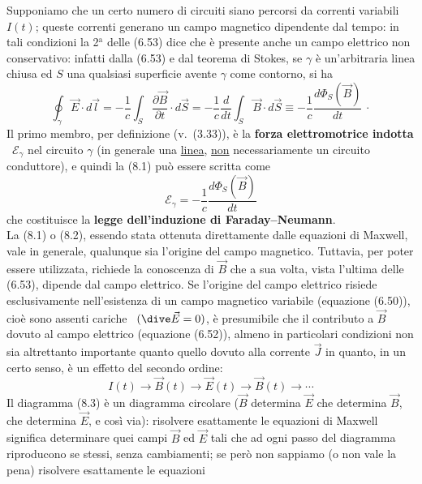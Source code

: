 Supponiamo che un certo numero di circuiti siano percorsi da correnti variabili
$I(t)$; queste correnti generano un campo magnetico dipendente dal tempo: in
tali condizioni la 2$^\mathrm{a}$ delle (6.53) dice che \`e presente anche un
campo elettrico non conservativo: infatti dalla (6.53) e dal teorema di Stokes,
se $\gamma$ \`e un'arbitraria linea chiusa ed $S$ una qualsiasi superficie
avente $\gamma$ come contorno, si ha
\begin{equation}
  \oint_\gamma\vec E\cdot d\vec l
  =-\frac{1}{c}\int_S\frac{\partial\vec B}{\partial t}\cdot d\vec S
  =-\frac{1}{c}\frac{d}{dt}\int_S\vec B\cdot d\vec S
  \equiv-\frac{1}{c}\frac{d\Phi_S(\vec B)}{dt}\,\cdot
  \tag{8.1}
\end{equation}
Il primo membro, per definizione \big(v.\ (3.33)\big), \`e la \textbf{forza
elettromotrice indotta} \ $\mathcal E_\gamma$ nel circuito $\gamma$ (in generale
una \underline{linea}, \underline{non} necessariamente un circuito conduttore),
e quindi la (8.1) pu\`o essere scritta come
\begin{equation}
  \mathcal E_\gamma=-\frac{1}{c}\frac{d\Phi_S(\vec B)}{dt}
  \tag{8.2}
\end{equation}
che costituisce la \textbf{legge dell'induzione di Faraday--Neumann}.\\
La (8.1) o (8.2), essendo stata ottenuta direttamente dalle equazioni di
Maxwell, vale in generale, qualunque sia l'origine del campo magnetico.
Tuttavia, per poter essere utilizzata, richiede la conoscenza di $\vec B$ che a
sua volta, vista l'ultima delle (6.53), dipende dal campo elettrico. Se
l'origine del campo elettrico risiede esclusivamente nell'esistenza di un campo
magnetico variabile \big(equazione (6.50)\big), cio\`e sono assenti cariche
\ $(\dive\vec E=0)$, \`e presumibile che il contributo a $\vec B$ dovuto al
campo elettrico \big(equazione (6.52)\big), almeno in particolari condizioni non
sia altrettanto importante quanto quello dovuto alla corrente $\vec J$ in
quanto, in un certo senso, \`e un effetto del secondo ordine:
\begin{equation}
  I(t)\to\vec B(t)\to\vec E(t)\to\vec B(t)\to\cdots
  \tag{8.3}
\end{equation}
Il diagramma (8.3) \`e un diagramma circolare ($\vec B$ determina $\vec E$ che
determina $\vec B$, che determina $\vec E$, e cos\`i via): risolvere esattamente
le equazioni di Maxwell significa determinare quei campi $\vec B$ ed $\vec E$
tali che ad ogni passo del diagramma riproducono se stessi, senza cambiamenti;
se per\`o non sappiamo (o non vale la pena) risolvere esattamente le equazioni
